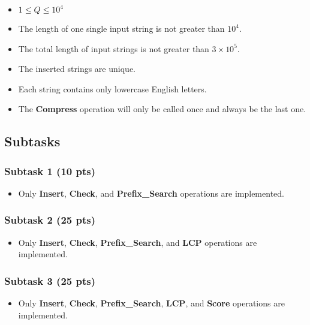 \begin{itemize}
    \item $1 \leq Q \leq 10^4$
    \item The length of one single input string is not greater than $10^4$.
    \item The total length of input strings is not greater than $3 \times 10^5$.
    \item The inserted strings are unique.
    \item Each string contains only lowercase English letters.
    \item The \textbf{Compress} operation will only be called once and always be the last one.
\end{itemize}

\subsection{Subtasks}

\subsubsection{Subtask 1 (10 pts)}

\begin{itemize}
    \item Only \textbf{Insert}, \textbf{Check}, and \textbf{Prefix\_Search} operations are implemented.
\end{itemize}

\subsubsection{Subtask 2 (25 pts)}

\begin{itemize}
    \item Only \textbf{Insert}, \textbf{Check}, \textbf{Prefix\_Search}, and \textbf{LCP} operations are implemented.
\end{itemize}

\subsubsection{Subtask 3 (25 pts)}

\begin{itemize}
    \item Only \textbf{Insert}, \textbf{Check}, \textbf{Prefix\_Search}, \textbf{LCP}, and \textbf{Score} operations are implemented.
\end{itemize}

